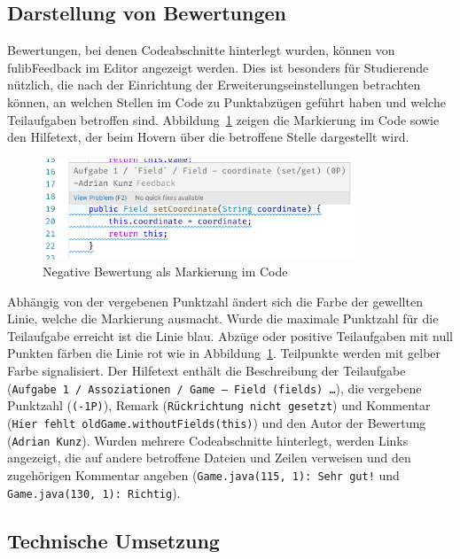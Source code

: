 \subsection{Darstellung von Bewertungen}

Bewertungen, bei denen Codeabschnitte hinterlegt wurden, können von fulibFeedback im Editor angezeigt werden.
Dies ist besonders für Studierende nützlich, die nach der Einrichtung der Erweiterungseinstellungen betrachten können, an welchen Stellen im Code zu Punktabzügen geführt haben und welche Teilaufgaben betroffen sind.
Abbildung~\ref{fig:fulibFeedback-negative} zeigen die Markierung im Code sowie den Hilfetext, der beim Hovern über die betroffene Stelle dargestellt wird.

\begin{figure}
    \centering
    \includegraphics[width=0.83\textwidth]{images/fulibFeedback-positive}
    \caption{Negative Bewertung als Markierung im Code}
    \label{fig:fulibFeedback-negative}
\end{figure}

Abhängig von der vergebenen Punktzahl ändert sich die Farbe der gewellten Linie, welche die Markierung ausmacht.
Wurde die maximale Punktzahl für die Teilaufgabe erreicht ist die Linie blau.
Abzüge oder positive Teilaufgaben mit null Punkten färben die Linie rot wie in Abbildung~\ref{fig:fulibFeedback-negative}.
Teilpunkte werden mit gelber Farbe signalisiert.
Der Hilfetext enthält die Beschreibung der Teilaufgabe (\texttt{Aufgabe 1 / Assoziationen / Game -- Field (fields) \dots}), die vergebene Punktzahl (\texttt{(-1P)}), Remark (\texttt{Rückrichtung nicht gesetzt}) und Kommentar (\texttt{Hier fehlt oldGame.withoutFields(this)}) und den Autor der Bewertung (\texttt{Adrian Kunz}).
Wurden mehrere Codeabschnitte hinterlegt, werden Links angezeigt, die auf andere betroffene Dateien und Zeilen verweisen und den zugehörigen Kommentar angeben (\texttt{Game.java(115, 1): Sehr gut!} und \texttt{Game.java(130, 1): Richtig}).

\subsection{Technische Umsetzung}\label{subsec:fulibFeedback-tech}

